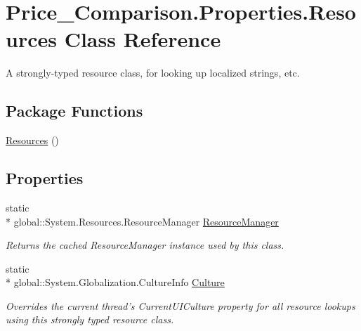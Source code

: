 \hypertarget{class_price___comparison_1_1_properties_1_1_resources}{\section{Price\-\_\-\-Comparison.\-Properties.\-Resources Class Reference}
\label{class_price___comparison_1_1_properties_1_1_resources}
}


A strongly-\/typed resource class, for looking up localized strings, etc.  


\subsection*{Package Functions}
\begin{DoxyCompactItemize}
\item 
\hyperlink{class_price___comparison_1_1_properties_1_1_resources_ac132bd871d7fb888f927139bbd66e32e}{Resources} ()
\end{DoxyCompactItemize}
\subsection*{Properties}
\begin{DoxyCompactItemize}
\item 
static \\*
global\-::\-System.\-Resources.\-Resource\-Manager \hyperlink{class_price___comparison_1_1_properties_1_1_resources_ad35d3b18ae6e0e3f69519e1faf5e6526}{Resource\-Manager}
\begin{DoxyCompactList}\small\item\em Returns the cached Resource\-Manager instance used by this class. \end{DoxyCompactList}\item 
static \\*
global\-::\-System.\-Globalization.\-Culture\-Info \hyperlink{class_price___comparison_1_1_properties_1_1_resources_ab30ad00e418076b616a98d4615cb53c7}{Culture}
\begin{DoxyCompactList}\small\item\em Overrides the current thread's Current\-U\-I\-Culture property for all resource lookups using this strongly typed resource class. \end{DoxyCompactList}\end{DoxyCompactItemize}
